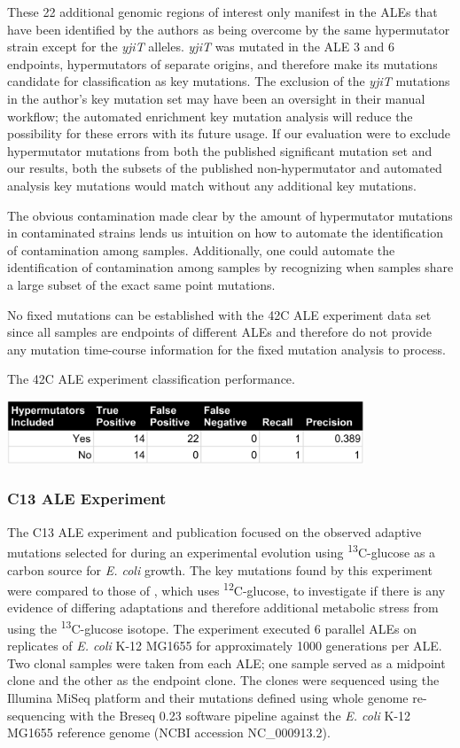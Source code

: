 \documentclass[12pt,final,masters,chapterheads]{ucsd}  %
\begin{document}
These 22 additional genomic regions of interest only manifest in the ALEs that have been identified by the authors as being overcome by the same hypermutator strain except for the \textit{yjiT} alleles. \textit{yjiT} was mutated in the ALE 3 and 6 endpoints, hypermutators of separate origins, and therefore make its mutations candidate for classification as key mutations. The exclusion of the \textit{yjiT} mutations in the author's key mutation set may have been an oversight in their manual workflow; the automated enrichment key mutation analysis will reduce the possibility for these errors with its future usage. If our evaluation were to exclude hypermutator mutations from both the published significant mutation set and our results, both the subsets of the published non-hypermutator and automated analysis key mutations would match without any additional key mutations. 

The obvious contamination made clear by the amount of hypermutator mutations in contaminated strains lends us intuition on how to automate the identification of contamination among samples. Additionally, one could automate the identification of contamination among samples by  recognizing when samples share a large subset of the exact same point mutations.

No fixed mutations can be established with the 42C ALE experiment data set since all samples are endpoints of different ALEs and therefore do not provide any mutation time-course information for the fixed mutation analysis to process.
\begin{table}[H]
  \centering
  \caption{The 42C ALE experiment classification performance.}
  \includegraphics[width=0.8\textwidth]{42c_precision_recall.png}
\end{table}
\subsubsection{C13 ALE Experiment}
The C13 ALE experiment and publication focused on the observed adaptive mutations selected for during an experimental evolution using \textsuperscript{13}C-glucose as a carbon source for \textit{E. coli} growth. The key mutations found by this experiment were compared to those of \cite{pmid25304508}, which uses \textsuperscript{12}C-glucose, to investigate if there is any evidence of differing adaptations and therefore additional metabolic stress from using the \textsuperscript{13}C-glucose isotope. The experiment executed 6 parallel ALEs  on replicates of \textit{E. coli} K-12 MG1655 for approximately 1000 generations per ALE. Two clonal samples were taken from each ALE; one sample served as a midpoint clone and the other as the endpoint clone. The clones were sequenced using the Illumina MiSeq platform and their mutations defined using whole genome re-sequencing with the Breseq 0.23 software pipeline against the \textit{E. coli} K-12 MG1655 reference genome (NCBI accession NC\_000913.2).
\end{document}

